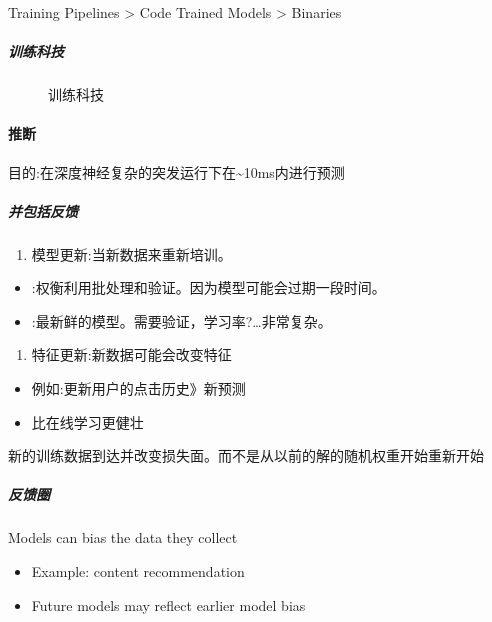 \documentclass[letterpaper,11pt,english]{sphinxmanual}
\begin{document}
Training Pipelines \sphinxhyphen{}> Code Trained Models \sphinxhyphen{}> Binaries


\subparagraph{训练科技}
\label{\detokenize{chapter_project/Model Process:id7}}
\begin{figure}[H]
\centering
\capstart

\noindent{}
\caption{训练科技}\label{\detokenize{chapter_project/Model Process:id14}}\end{figure}


\paragraph{推断}
\label{\detokenize{chapter_project/Model Process:id8}}
目的:在深度神经复杂的突发运行下在\textasciitilde{}10ms内进行预测


\subparagraph{并包括反馈}
\label{\detokenize{chapter_project/Model Process:id9}}\begin{enumerate}
%
\item {} 
模型更新:当新数据来重新培训。

\end{enumerate}
\begin{itemize}
\item {} 
:权衡利用批处理和验证。因为模型可能会过期一段时间。

\item {} 
:最新鲜的模型。需要验证，学习率?…非常复杂。

\end{itemize}
\begin{enumerate}
%
\setcounter{enumi}{1}
\item {} 
特征更新:新数据可能会改变特征

\end{enumerate}
\begin{itemize}
\item {} 
例如:更新用户的点击历史\sphinxhyphen{}》新预测

\item {} 
比在线学习更健壮

\end{itemize}

新的训练数据到达并改变损失面。而不是从以前的解的随机权重开始重新开始


\subparagraph{反馈圈}
\label{\detokenize{chapter_project/Model Process:id10}}
Models can bias the data they collect
\begin{itemize}
\item {} 
Example: content recommendation

\item {} 
Future models may reflect earlier model bias

\end{itemize}
\end{document}
